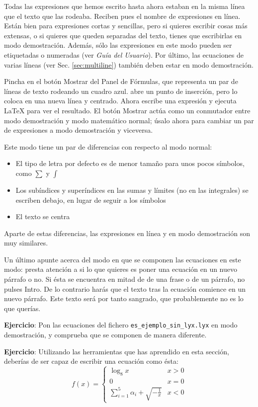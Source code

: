 Todas las expresiones que hemos escrito hasta ahora estaban en la
misma línea que el texto que las rodeaba. Reciben pues el nombre de
expresiones en línea. Están bien para expresiones cortas y sencillas,
pero si quieres escribir cosas más extensas, o si quieres que queden
separadas del texto, tienes que escribirlas en modo demostración.
Además, sólo las expresiones en este modo pueden ser etiquetadas o
numeradas (ver \emph{Guía del Usuario}). Por último, las ecuaciones
de varias líneas (ver Sec. \ref{sec:multiline}) también deben estar
en modo demostración.

Pincha en el botón \textsf{Mostrar} del \textsf{Panel de Fórmulas},
que representa un par de líneas de texto rodeando un cuadro azul.
\LyX{} abre un punto de inserción, pero lo coloca en una nueva línea
y centrado. Ahora escribe una expresión y ejecuta \LaTeX{} para ver
el resultado. El botón \textsf{Mostrar} actúa como un conmutador entre
modo demostración y modo matemático normal; úsalo ahora para cambiar
un par de expresiones a modo demostración y viceversa.

Este modo tiene un par de diferencias con respecto al modo normal:

\begin{itemize}
\item El tipo de letra por defecto es de menor tamaño para unos pocos símbolos,
como $\sum$ y $\int$
\item Los subíndices y superíndices en las sumas y límites (no en las integrales)
se escriben debajo, en lugar de seguir a los símbolos
\item El texto se centra
\end{itemize}
Aparte de estas diferencias, las expresiones en línea y en modo demostración
son muy similares.

Un último apunte acerca del modo en que se componen las ecuaciones
en este modo: presta atención a si lo que quieres es poner una ecuación
en un nuevo párrafo o no. Si ésta se encuentra en mitad de de una
frase o de un párrafo, no pulses \textsf{Intro}. De lo contrario harás
que el texto tras la ecuación comience en un nuevo párrafo. Este texto
será por tanto sangrado, que probablemente no es lo que querías.

\textbf{Ejercicio}: Pon las ecuaciones del fichero \texttt{es\_ejemplo\_sin\_lyx.lyx}
en modo demostración, y comprueba que se componen de manera diferente.

\textbf{Ejercicio}: Utilizando las herramientas que has aprendido
en esta sección, deberías de ser capaz de escribir una ecuación como
ésta: \[
f(x)=\left\{ \begin{array}{cc}
\log_{8}x & x>0\\
0 & x=0\\
\sum_{i=1}^{5}\alpha_{i}+\sqrt{-\frac{1}{x}} & x<0\end{array}\right.\]



